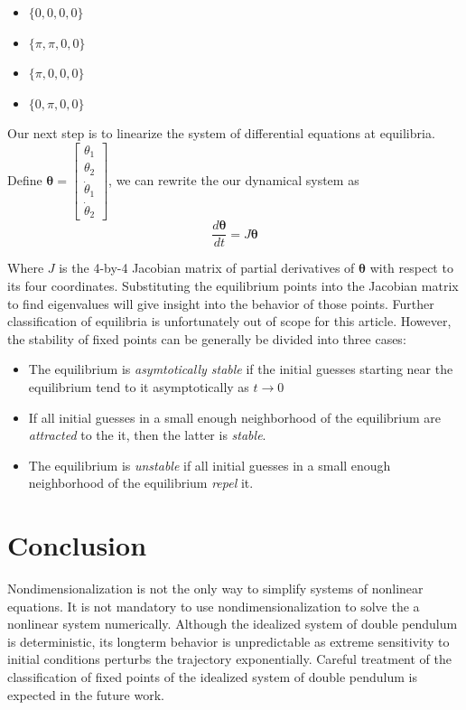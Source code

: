 \documentclass{article}
\begin{document}
\begin{itemize}
	\item $\{0, 0, 0, 0\}$
	\item $\{\pi, \pi, 0, 0\}$
	\item $\{\pi, 0, 0, 0\}$
	\item $\{0, \pi, 0, 0\}$
\end{itemize}

Our next step is to linearize the system of differential equations at equilibria. Define $\bm{\theta} = \left[\begin{smallmatrix}\theta_1 \\ \theta_2 \\ \dot\theta_1 \\ \dot\theta_2\end{smallmatrix}\right]$, we can rewrite the our dynamical system as
\begin{equation}
\frac{d\bm{\theta}}{dt} = J\bm{\theta}
\end{equation}

Where $J$ is the 4-by-4 Jacobian matrix of partial derivatives of $\bm{\theta}$ with respect to its four coordinates. Substituting the equilibrium points into the Jacobian matrix to find eigenvalues will give insight into the behavior of those points. Further classification of equilibria is unfortunately out of scope for this article. However, the stability of fixed points can be generally be divided into three cases:

\begin{itemize}
	\item The equilibrium is \textit{asymtotically stable} if the initial guesses starting near the equilibrium tend to it asymptotically as $t\rightarrow 0$
	\item If all initial guesses in a small enough neighborhood of the equilibrium are \textit{attracted} to the it, then the latter is \textit{stable}.
	\item The equilibrium is \textit{unstable} if all initial guesses in a small enough neighborhood of the equilibrium \textit{repel} it.
\end{itemize}

\section{Conclusion}
Nondimensionalization is not the only way to simplify systems of nonlinear equations. It is not mandatory to use nondimensionalization to solve the a nonlinear system numerically. Although the idealized system of double pendulum is deterministic, its longterm behavior is unpredictable as extreme sensitivity to initial conditions perturbs the trajectory exponentially. Careful treatment of the classification of fixed points of the idealized system of double pendulum is expected in the future work.
\newpage


\nocite{*}
\end{document}
